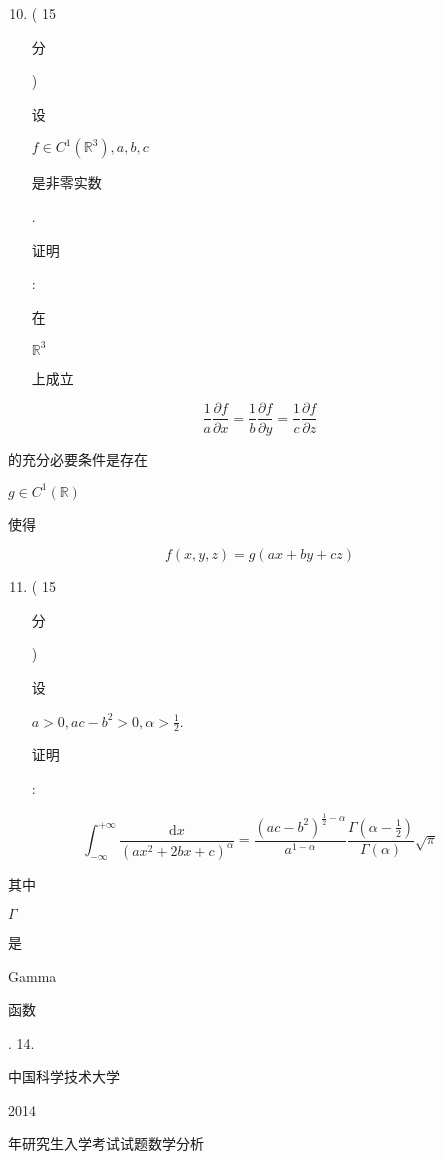 \documentclass[10pt]{article}
\begin{document}
\begin{enumerate}
  \setcounter{enumi}{9}
  \item ( 15 \begin{CJK}{UTF8}{mj}分\end{CJK}) \begin{CJK}{UTF8}{mj}设\end{CJK} $f \in C^{1}\left(\mathbb{R}^{3}\right), a, b, c$ \begin{CJK}{UTF8}{mj}是非零实数\end{CJK}. \begin{CJK}{UTF8}{mj}证明\end{CJK}: \begin{CJK}{UTF8}{mj}在\end{CJK} $\mathbb{R}^{3}$ \begin{CJK}{UTF8}{mj}上成立\end{CJK}
\end{enumerate}
$$
\frac{1}{a} \frac{\partial f}{\partial x}=\frac{1}{b} \frac{\partial f}{\partial y}=\frac{1}{c} \frac{\partial f}{\partial z}
$$
\begin{CJK}{UTF8}{mj}的充分必要条件是存在\end{CJK} $g \in C^{1}(\mathbb{R})$ \begin{CJK}{UTF8}{mj}使得\end{CJK}
$$
f(x, y, z)=g(a x+b y+c z)
$$

\begin{enumerate}
  \setcounter{enumi}{10}
  \item ( 15 \begin{CJK}{UTF8}{mj}分\end{CJK}) \begin{CJK}{UTF8}{mj}设\end{CJK} $a>0, a c-b^{2}>0, \alpha>\frac{1}{2}$. \begin{CJK}{UTF8}{mj}证明\end{CJK}:
\end{enumerate}
$$
\int_{-\infty}^{+\infty} \frac{\mathrm{d} x}{\left(a x^{2}+2 b x+c\right)^{\alpha}}=\frac{\left(a c-b^{2}\right)^{\frac{1}{2}-\alpha}}{a^{1-\alpha}} \frac{\Gamma\left(\alpha-\frac{1}{2}\right)}{\Gamma(\alpha)} \sqrt{\pi}
$$
\begin{CJK}{UTF8}{mj}其中\end{CJK} $\Gamma$ \begin{CJK}{UTF8}{mj}是\end{CJK} Gamma \begin{CJK}{UTF8}{mj}函数\end{CJK}. 14. \begin{CJK}{UTF8}{mj}中国科学技术大学\end{CJK} 2014 \begin{CJK}{UTF8}{mj}年研究生入学考试试题数学分析\end{CJK}
\end{document}
